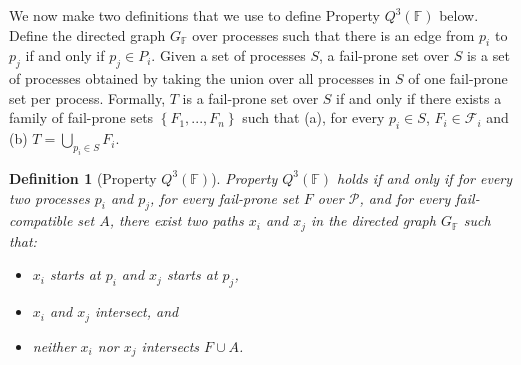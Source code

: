 \documentclass[11pt]{article}
\newtheorem{definition}{Definition}
\begin{document}
We now make two definitions that we use to define Property $Q^3(\mathbb{F})$ below. Define the directed graph $G_\mathbb{F}$ over processes such that there is an edge from $p_i$ to $p_j$ if and only if $p_j\in P_i$. Given a set of processes $S$, a fail-prone set over $S$ is a set of processes obtained by taking the union over all processes in $S$ of one fail-prone set per process. Formally, $T$ is a fail-prone set over $S$ if and only if there exists a family of fail-prone sets $\left\{F_1,...,F_n\right\}$ such that (a), for every $p_i\in S$, $F_i\in \mathcal{F}_i$ and (b) $T=\bigcup_{p_i\in S} F_i$.



\begin{definition}[Property $Q^3(\mathbb{F})$]
  Property $Q^3(\mathbb{F})$ holds if and only if for every two processes $p_i$ and $p_j$, for every fail-prone set $F$ over $\mathcal{P}$, and for every fail-compatible set $A$, there exist two paths $x_i$ and $x_j$ in the directed graph $G_{\mathbb{F}}$ such that:
  \begin{itemize}
    \item $x_i$ starts at $p_i$ and $x_j$ starts at $p_j$,
    \item $x_i$ and $x_j$ intersect, and
    \item neither $x_i$ nor $x_j$ intersects $F\cup A$.
  \end{itemize}
\end{definition}
\end{document}
